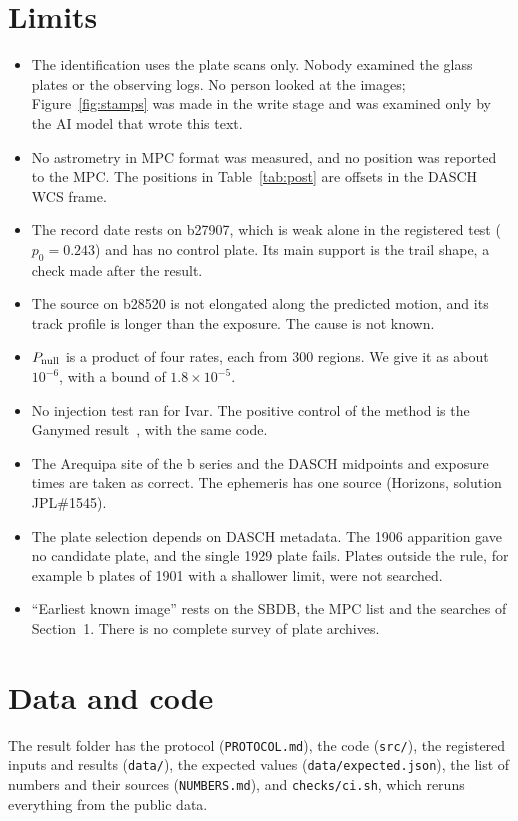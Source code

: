 \documentclass[11pt]{article}
\begin{document}
\section{Limits}
\begin{itemize}
\item The identification uses the plate scans only. Nobody examined the glass plates or the observing logs. No person looked at the images; Figure~\ref{fig:stamps} was made in the write stage and was examined only by the AI model that wrote this text.
\item No astrometry in MPC format was measured, and no position was reported to the MPC. The positions in Table~\ref{tab:post} are offsets in the DASCH WCS frame.
\item The record date rests on b27907, which is weak alone in the registered test ($p_0=0.243$) and has no control plate. Its main support is the trail shape, a check made after the result.
\item The source on b28520 is not elongated along the predicted motion, and its track profile is longer than the exposure. The cause is not known.
\item $P_{\rm null}$ is a product of four rates, each from 300 regions. We give it as about $10^{-6}$, with a bound of $1.8\times10^{-5}$.
\item No injection test ran for Ivar. The positive control of the method is the Ganymed result~\cite{wu2026ganymed}, with the same code.
\item The Arequipa site of the b series and the DASCH midpoints and exposure times are taken as correct. The ephemeris has one source (Horizons, solution JPL\#1545).
\item The plate selection depends on DASCH metadata. The 1906 apparition gave no candidate plate, and the single 1929 plate fails. Plates outside the rule, for example b plates of 1901 with a shallower limit, were not searched.
\item ``Earliest known image'' rests on the SBDB, the MPC list and the searches of Section~1. There is no complete survey of plate archives.
\end{itemize}

\section*{Data and code}
The result folder has the protocol (\texttt{PROTOCOL.md}), the code (\texttt{src/}), the registered inputs and results (\texttt{data/}), the expected values (\texttt{data/expected.json}), the list of numbers and their sources (\texttt{NUMBERS.md}), and \texttt{checks/ci.sh}, which reruns everything from the public data.
\end{document}

